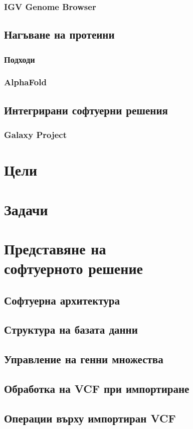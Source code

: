 \documentclass[pdftex,cyrillic,14pt,a4page,twoside]{extreport}
\begin{document}
\subsection{IGV Genome Browser}
\section{Нагъване на протеини}
\subsection{Подходи}
\subsection{AlphaFold}
\section{Интегрирани софтуерни решения}
\subsection{Galaxy Project}
\chapter{Цели}
\chapter{Задачи}
\chapter{Представяне на\\ софтуерното решение}
\section{Софтуерна архитектура}
\section{Структура на базата данни}
\section{Управление на генни множества}
\section{Обработка на VCF при импортиране}
\section{Операции върху импортиран VCF}
\end{document}
